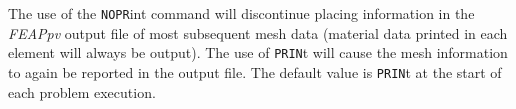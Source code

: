 \headb

The use of the {\tt NOPR}int command will discontinue
placing information in the {\sl FEAPpv} output file
of most subsequent mesh data (material
data printed in each element will always be output).
The use of {\tt PRIN}t will cause
the mesh information to again be reported in the output file.  The
default value is {\tt PRIN}t at the start of each problem execution.
\vfil\eject
